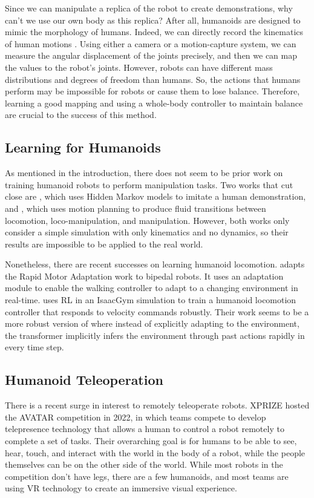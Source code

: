 Since we can manipulate a replica of the robot to create demonstrations, why can't we use our own body as this replica? After all, humanoids are designed to mimic the morphology of humans. 
Indeed, we can directly record the kinematics of human motions \cite{Billard:2013}. Using either a camera or a motion-capture system, we can measure the angular displacement of the joints precisely, and then we can map the values to the robot's joints. However, robots can have different mass distributions and degrees of freedom than humans. So, the actions that humans perform may be impossible for robots or cause them to lose balance. Therefore, learning a good mapping and using a whole-body controller to maintain balance are crucial to the success of this method.

\subsection{Learning for Humanoids}
As mentioned in the introduction, there does not seem to be prior work on training humanoid robots to perform manipulation tasks. 
Two works that cut close are \cite{4115578}, which uses Hidden Markov models to imitate a human demonstration, and \cite{7989550}, which uses motion planning to produce fluid transitions between locomotion, loco-manipulation, and manipulation. However, both works only consider a simple simulation with only kinematics and no dynamics, so their results are impossible to be applied to the real world.

Nonetheless, there are recent successes on learning humanoid locomotion.
\cite{kumar2022adapting} adapts the Rapid Motor Adaptation work \cite{kumar2021rma} to bipedal robots. It uses an adaptation module to enable the walking controller to adapt to a changing environment in real-time. \cite{radosavovic2023learning} uses RL in an IsaacGym simulation to train a humanoid locomotion controller that responds to velocity commands robustly. Their work seems to be a more robust version of \cite{kumar2022adapting} where instead of explicitly adapting to the environment, the transformer implicitly infers the environment through past actions rapidly in every time step. 

\subsection{Humanoid Teleoperation}

There is a recent surge in interest to remotely teleoperate robots. 
XPRIZE hosted the AVATAR competition in 2022, in which teams compete to develop telepresence technology that allows a human to control a robot remotely to complete a set of tasks. 
Their overarching goal is for humans to be able to see, hear, touch, and interact with the world in the body of a robot, while the people themselves can be on the other side of the world.
While most robots in the competition don't have legs, there are a few humanoids, and most teams are using VR technology to create an immersive visual experience.

